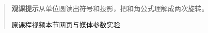 \begin{quote}\small\textbf{观课提示}\quad 从单位圆读出符号和投影，把和角公式理解成两次旋转。

\href{https://www.youtube.com/watch?v=yBw67Fb31Cs}{原课程视频}\quad\href{https://vitael04213.github.io/3blue1brown-notes/lessons/ldm-trigonometry.html}{本节网页与媒体}\quad\href{https://vitael04213.github.io/3blue1brown-notes/lab.html\#complex}{参数实验}
\end{quote}
